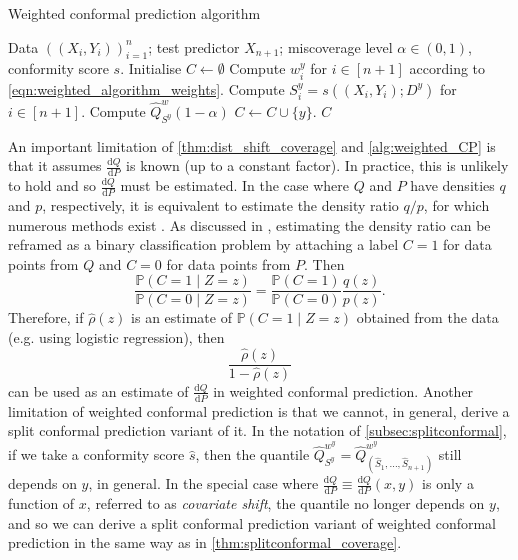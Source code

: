 \documentclass[11pt, titlepage]{article} %
\newcommand{\R}{\mathrm}
\newcommand{\Prob}[1]{\mathbb{P}\left( #1 \right)}
\numberwithin{equation}{section}
\theoremstyle{definition}
\numberwithin{theorem}{section}
\numberwithin{lemma}{section}
\numberwithin{corollary}{section}
\numberwithin{proposition}{section}
\numberwithin{definition}{section}
\numberwithin{remark}{section}
\begin{document}
\begin{algorithm}[H]
    \caption{Weighted conformal prediction algorithm}
    \label{alg:weighted_CP}
    \begin{algorithmic}
        \Require Data \(((X_i, Y_i))_{i=1}^n\); test predictor \(X_{n+1}\); miscoverage level \(\alpha \in (0,1)\), conformity score \(s\).
        \State Initialise \(C \gets \emptyset\)       
            \State Compute \(w_i^y\) for \(i \in [n+1]\) according to \eqref{eqn:weighted_algorithm_weights}.
            \State Compute \(S_i^y = s((X_i, Y_i); D^y)\) for \(i \in [n+1]\).
            \State Compute \(\hat{Q}^w_{S^y}(1-\alpha)\)
                \State \(C \gets C \cup \{y\} \).
            \EndIf      
        \EndFor
        \Ensure \(C\)
    \end{algorithmic}
\end{algorithm}

\noindent
An important limitation of \cref{thm:dist_shift_coverage} and \cref{alg:weighted_CP} is that it assumes \(\frac{\R{d}Q}{\R{d}P}\) is known (up to a constant factor). In practice, this is unlikely to hold and so \(\frac{\R{d}Q}{\R{d}P}\) must be estimated. In the case where \(Q\) and \(P\) have densities \(q\) and \(p\), respectively, it is equivalent to estimate the density ratio \(q/p\), for which numerous methods exist \cite{sugiyama2012density}. As discussed in \cite{tibshirani2019covariateshift}, estimating the density ratio can be reframed as a binary classification problem by attaching a label \(C = 1\) for data points from \(Q\) and \(C = 0\) for data points from \(P\). Then \[\frac{\Prob{C = 1 \mid Z = z}}{\Prob{C = 0 \mid Z = z}} = \frac{\Prob{C = 1}}{\Prob{C = 0}} \frac{q(z)}{p(z)}.\] Therefore, if \(\hat{\rho}(z)\) is an estimate of \(\Prob{C = 1 \mid Z = z}\) obtained from the data (e.g. using logistic regression), then \[\frac{\hat{\rho}(z)}{1-\hat{\rho}(z)}\] can be used as an estimate of \(\frac{\R{d}Q}{\R{d}P}\) in weighted conformal prediction. Another limitation of weighted conformal prediction is that we cannot, in general, derive a split conformal prediction variant of it. In the notation of \cref{subsec:splitconformal}, if we take a conformity score \(\hat{s}\), then the quantile \(\hat{Q}^{w^y}_{S^y} = \hat{Q}^{w^y}_{(\hat{S}_1, \ldots, \hat{S}_{n+1})}\) still depends on \(y\), in general. In the special case where \(\frac{\R{d}Q}{\R{d}P} \equiv \frac{\R{d}Q}{\R{d}P}(x,y)\) is only a function of \(x\), referred to as \textit{covariate shift}, the quantile no longer depends on \(y\), and so we can derive a split conformal prediction variant of weighted conformal prediction in the same way as in \cref{thm:splitconformal_coverage}. \vskip5pt
\end{document}
